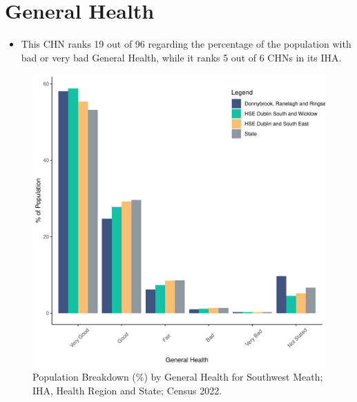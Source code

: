 \documentclass{article}
\begin{document}
\pagebreak

\section{General Health}\label{sect:GenHealth}
\begin{itemize}
\item  This CHN ranks  19 out of 96 regarding the percentage of the population with bad or very bad General Health, while it ranks   5 out of 6 CHNs in its IHA.
\end{itemize}
\begin{figure}[h]
	\centering
	\includegraphics[width = 150mm]{../figures/GenED.pdf}
	\caption{Population Breakdown (\%) by General Health for Southwest Meath; IHA, Health Region and State;  Census 2022.}
	\label{fig:2ae19629-1a6a-13a3-e055-000000000001}
	\end{figure}
\end{document}

